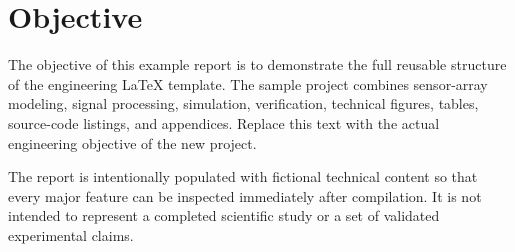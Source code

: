 \chapter*{Objective}

\begin{objective}
The objective of this example report is to demonstrate the full reusable structure of the
engineering LaTeX template. The sample project combines sensor-array modeling, signal
processing, simulation, verification, technical figures, tables, source-code listings, and
appendices. Replace this text with the actual engineering objective of the new project.
\end{objective}

The report is intentionally populated with fictional technical content so that every major
feature can be inspected immediately after compilation. It is not intended to represent a
completed scientific study or a set of validated experimental claims.
